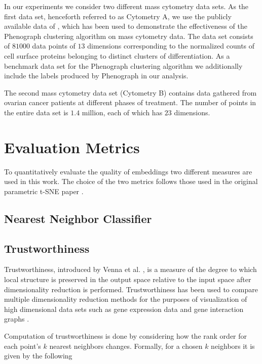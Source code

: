 In our experiments we consider two different mass cytometry data sets. As the first data set, henceforth referred to as Cytometry A, we use the publicly available data of \cite{phenograph}, which has been used to demonstrate the effectiveness of the Phenograph clustering algorithm on mass cytometry data. The data set consists of $81000$ data points of $13$ dimensions corresponding to the normalized counts of cell surface proteins belonging to distinct clusters of differentiation. As a benchmark data set for the Phenograph clustering algorithm we additionally include the labels produced by Phenograph in our analysis.

The second mass cytometry data set (Cytometry B) contains data gathered from ovarian cancer patients at different phases of treatment. The number of points in the entire data set is $1.4$ million, each of which has $23$ dimensions.

\newpage
\section{Evaluation Metrics}

To quantitatively evaluate the quality of embeddings two different measures are used in this work. The choice of the two metrics follows those used in the original parametric t-SNE paper \cite{parametric_tsne}.

\subsection{Nearest Neighbor Classifier}
\subsection{Trustworthiness}

Trustworthiness, introduced by Venna et al. \cite{trustworthiness}, is a measure of the degree to which local structure is preserved in the output space relative to the input space after dimensionality reduction is performed. Trustworthiness has been used to compare multiple dimensionality reduction methods for the purposes of visualization of high dimensional data sets such as gene expression data \cite{trustworthiness_gene_expression} and gene interaction graphs \cite{trustworthiness_gene_interaction}.

Computation of trustworthiness is done by considering how the rank order for each point's $k$ nearest neighbors changes. Formally, for a chosen $k$ neighbors it is given by the following 

